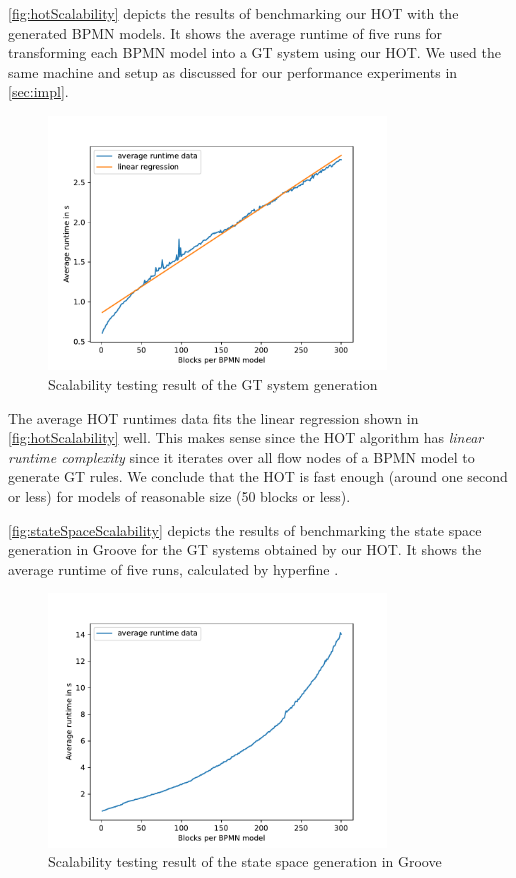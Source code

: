 \documentclass{lmcs} %
\begin{document}
\autoref{fig:hotScalability} depicts the results of benchmarking our HOT with the generated BPMN models.
It shows the average runtime of five runs for transforming each BPMN model into a GT system using our HOT.
We used the same machine and setup as discussed for our performance experiments in \autoref{sec:impl}.

\begin{figure}[ht]
    \centering
    \includegraphics[width=0.8\textwidth]{images/HOT_scalability.pdf}
    \caption{Scalability testing result of the GT system generation}
    \label{fig:hotScalability}
\end{figure}

The average HOT runtimes data fits the linear regression shown in \autoref{fig:hotScalability} well.
This makes sense since the HOT algorithm has \textit{linear runtime complexity} since it iterates over all flow nodes of a BPMN model to generate GT rules.
We conclude that the HOT is fast enough (around one second or less) for models of reasonable size (50 blocks or less).

\autoref{fig:stateSpaceScalability} depicts the results of benchmarking the state space generation in Groove for the GT systems obtained by our HOT.
It shows the average runtime of five runs, calculated by hyperfine \cite{peterHyperfine2023}.

\begin{figure}[ht]
    \centering
    \includegraphics[width=0.8\textwidth]{images/StateSpaceGeneration_scalability.pdf}
    \caption{Scalability testing result of the state space generation in Groove}
    \label{fig:stateSpaceScalability}
\end{figure}
\end{document}
